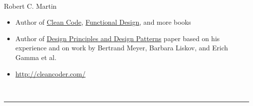 \documentclass[calcdimensions,landscape,letterpaper]{powersem}
\newcommand{\thecurrentheading}{}
\newcommand{\heading}[1]{\renewcommand{\thecurrentheading}{#1}}
\begin{document}
\begin{slide}
  \heading{SOLID Authors}
  \begin{center}
    \begin{minipage}[b]{.25\textwidth}
      \begin{center}
        \\
        Robert C. Martin\bigskip\\
      \end{center}
    \end{minipage}
    \begin{minipage}[b]{.7\textwidth}
      \begin{itemize}
        \item Author of \href{https://www.informit.com/store/clean-code-a-handbook-of-agile-software-craftsmanship-9780132350884}{Clean Code}, \href{https://www.informit.com/store/functional-design-principles-patterns-and-practices-9780138176396}{Functional Design}, and more books
        \item Author of \href{https://staff.cs.utu.fi/~jounsmed/doos_06/material/DesignPrinciplesAndPatterns.pdf}{Design Principles and Design Patterns} paper based on his experience and on work by Bertrand Meyer, Barbara Liskov, and Erich Gamma et al.
        \item \url{http://cleancoder.com/}
      \end{itemize}
    \end{minipage}\\\rule{.95\textwidth}{1pt}
    \begin{minipage}[b]{.25\textwidth}
      \begin{center}

\end{center}
\end{minipage}
\end{center}
\end{slide}
\end{document}
